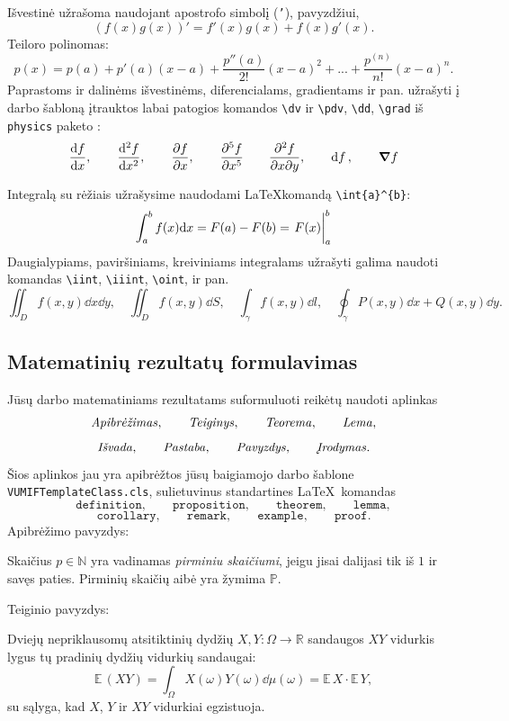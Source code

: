 \documentclass[]{VUMIFTemplateClass}
\newcommand{\EE}{\mathbb{E}\,} %
\begin{document}
Išvestinė užrašoma naudojant apostrofo simbolį (\texttt{'}), pavyzdžiui,
\[
(f(x)g(x))' = f'(x)g(x) + f(x)g'(x).
\]
Teiloro polinomas:
\[
p(x) = p(a) + p'(a)(x-a)+\frac{p''(a)}{2!}(x-a)^2 + ... + \frac{p^{(n)}}{n!}(x-a)^n.
\]
Paprastoms ir dalinėms išvestinėms, diferencialams, gradientams ir pan. užrašyti į darbo šabloną įtrauktos labai patogios komandos \texttt{\textbackslash dv} ir \texttt{\textbackslash pdv}, \texttt{\textbackslash dd}, \texttt{\textbackslash grad} iš \texttt{physics} paketo \cite{physdoc}:
\[
\dv{f}{x},  \qquad
\dv[2]{f}{x}, \qquad
\pdv{f}{x},  \qquad
\pdv[5]{f}{x} \qquad
\pdv{f}{x}{y}, \qquad
\dd{f}, \qquad
\grad{f}
\]

Integralą su rėžiais užrašysime naudodami \LaTeX komandą \texttt{\textbackslash int\textunderscore \{a\}\^{}\{b\}}:
\[
\int_{a}^{b}f(x) \dd x = F(a) - F(b) = \eval{F(x)}_{a}^{b}
\]
Daugialypiams, paviršiniams, kreiviniams integralams užrašyti galima naudoti komandas \texttt{\textbackslash iint}, \texttt{\textbackslash iiint}, \texttt{\textbackslash oint}, ir pan.
\[
\iint_{D}f(x, y)\dd{x}\dd{y},\quad
\iint_{D} f(x,y)\dd{S}, \quad
\int_{\gamma} f(x,y)\dd{l},\quad
\oint_{\gamma} P(x,y)\dd{x}+Q(x,y)\dd{y}.
\]

\subsection{Matematinių rezultatų formulavimas}

Jūsų darbo matematiniams rezultatams suformuluoti reikėtų naudoti aplinkas
\[
\text{\emph{Apibrėžimas}},\qquad \text{\emph{Teiginys}}, \qquad \text{\emph{Teorema}}, \qquad \text{\emph{Lema}},
\]
\[
\text{\emph{Išvada}}, \qquad \text{\emph{Pastaba}}, \qquad  \text{\emph{Pavyzdys}}, \qquad \text{\emph{Įrodymas}}.
\]
Šios aplinkos jau yra apibrėžtos
jūsų baigiamojo darbo šablone \texttt{VUMIFTemplateClass.cls}, sulietuvinus standartines \LaTeX\  komandas
\[
\texttt{definition}, \qquad \texttt{proposition}, \qquad \texttt{theorem}, \qquad \texttt{lemma},
\]
\[
\texttt{corollary}, \qquad \texttt{remark}, \qquad \texttt{example}, \qquad \texttt{proof}.
\]
\noindent Apibrėžimo pavyzdys:
\begin{definition}
Skaičius $p \in \mathbb{N}$ yra vadinamas \emph{pirminiu skaičiumi}, jeigu jisai dalijasi tik iš $1$ ir savęs paties. Pirminių skaičių aibė yra žymima $\mathbb{P}$.
\end{definition}
\noindent Teiginio pavyzdys:
\begin{proposition}
Dviejų nepriklausomų atsitiktinių dydžių $X, Y: \Omega \to \mathbb{R}$ sandaugos $XY$ vidurkis lygus tų pradinių dydžių vidurkių sandaugai:
\[
\EE{(XY)}=\int_{\Omega} X(\omega)Y(\omega)\dd\mu(\omega) = \EE{X} \cdot \EE{Y},
\]
su sąlyga, kad $X$, $Y$ ir $XY$ vidurkiai egzistuoja.
\end{proposition}
\end{document}
